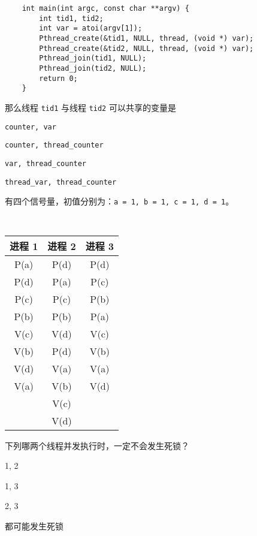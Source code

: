 \begin{problems}
\begin{verbatim}
    int main(int argc, const char **argv) {
        int tid1, tid2;
        int var = atoi(argv[1]);
        Pthread_create(&tid1, NULL, thread, (void *) var);
        Pthread_create(&tid2, NULL, thread, (void *) var);
        Pthread_join(tid1, NULL);
        Pthread_join(tid2, NULL);
        return 0;
    }
        \end{verbatim}
        那么线程 \verb|tid1| 与线程 \verb|tid2| 可以共享的变量是
        \begin{choices}
            \item \verb|counter, var|
            \item \verb|counter, thread_counter|
            \item \verb|var, thread_counter|
            \item \verb|thread_var, thread_counter|
        \end{choices}
         有四个信号量，初值分别为：\verb|a = 1, b = 1, c = 1, d = 1|。
        \begin{table}[H]
            \tt
            \centering
            \begin{tabular}{|c|c|c|}
                \hline
                进程 1 & 进程 2 & 进程 3 \\ \hline
                P(a) & P(d) & P(d) \\
                P(d) & P(a) & P(c) \\
                P(c) & P(c) & P(b) \\
                P(b) & P(b) & P(a) \\
                V(c) & V(d) & V(c) \\
                V(b) & P(d) & V(b) \\
                V(d) & V(a) & V(a) \\
                V(a) & V(b) & V(d) \\
                & V(c) &  \\
                & V(d) &  \\ \hline
            \end{tabular}
        \end{table}
        下列哪两个线程并发执行时，一定不会发生死锁？
        \begin{choices}
            \item 1, 2
            \item 1, 3
            \item 2, 3
            \item 都可能发生死锁
        \end{choices}

\end{problems}
